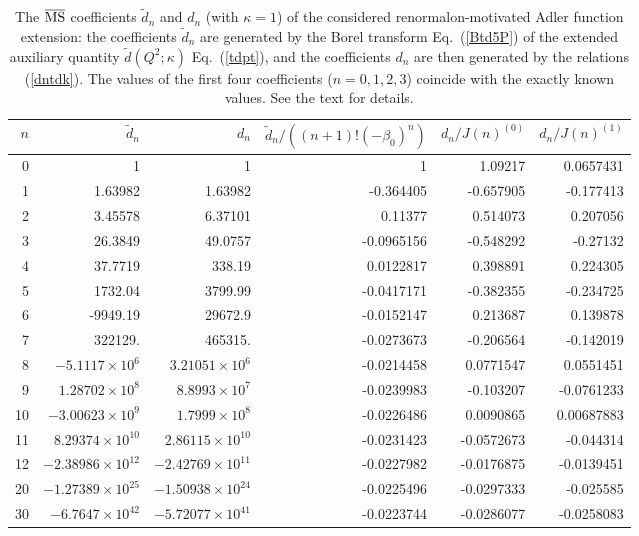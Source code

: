 \documentclass[aps,nofootinbib,showkeys,noshowpacs,preprintnumbers,amsmath,amssymb]{revtex4}
\newcommand{\td}{{\widetilde d}}
\newcommand{\MSbar}{\overline{\rm MS}}
\begin{document}
\begin{table}
  \caption{The $\MSbar$ coefficients $\td_n$ and $d_n$ (with $\kappa=1$) of the considered renormalon-motivated Adler function extension: the coefficients $\td_n$ are generated by the Borel transform Eq.~(\ref{Btd5P}) of the extended auxiliary quantity $\td(Q^2;\kappa)$ Eq.~(\ref{tdpt}), and the coefficients $d_n$ are then generated by the relations (\ref{dntdk}). The values of the first four coefficients ($n=0,1,2,3$) coincide with the exactly known values. See the text for details.}
\label{tabtdndn}
\begin{ruledtabular}
\begin{tabular}{r|rr|rrr}
 $n$ & $\td_n$ & $d_n$ & $\td_n/((n+1)! (-\beta_0)^n)$  & $d_n/J(n)^{(0)}$ &  $d_n/J(n)^{(1)}$
\\
\hline
0       &  1       & 1         &  1  & 1.09217  & 0.0657431 \\
1       &  1.63982 & 1.63982   &  -0.364405  & -0.657905   & -0.177413 \\
2       &  3.45578 & 6.37101 &  0.11377  &  0.514073   & 0.207056 \\
3       &  26.3849 & 49.0757 &  -0.0965156  & -0.548292  & -0.27132 \\
4       & 37.7719 & 338.19 &  0.0122817   & 0.398891  & 0.224305 \\
5       &  1732.04 & 3799.99 & -0.0417171 & -0.382355  & -0.234725 \\
6       & -9949.19 & 29672.9 & -0.0152147 & 0.213687  & 0.139878 \\
7       & 322129. & 465315. & -0.0273673 & -0.206564 &  -0.142019 \\
8       & $-5.1117 \times 10^{6}$ & $3.21051 \times 10^{6}$ & -0.0214458  & 0.0771547 &  0.0551451 \\
9       & $1.28702 \times 10^{8}$ & $8.8993 \times 10^{7}$ & -0.0239983 & -0.103207  & -0.0761233 \\
10      & $-3.00623 \times 10^{9}$ & $1.7999 \times 10^{8}$ & -0.0226486 & 0.0090865  & 0.00687883 \\
11      & $8.29374 \times 10^{10}$ & $2.86115 \times 10^{10}$ & -0.0231423 & -0.0572673  & -0.044314 \\
12      & $-2.38986 \times 10^{12}$ & $-2.42769 \times 10^{11}$ & -0.0227982 & -0.0176875  &-0.0139451 \\
\hline
20      & $-1.27389 \times 10^{25}$ & $-1.50938 \times 10^{24}$ & -0.0225496  & -0.0297333 & -0.025585 \\
\hline
30      & $-6.7647 \times 10^{42}$ & $-5.72077 \times 10^{41}$ & -0.0223744 & -0.0286077 & -0.0258083 \\

\end{tabular}
\end{ruledtabular}
\end{table}
\end{document}
